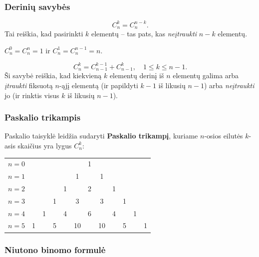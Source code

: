 \subsubsection*{Derinių savybės}

\begin{theorem}
\[
C_n^k = C_n^{n-k}.
\]
Tai reiškia, kad pasirinkti $k$ elementų -- tas pats, kas \emph{neįtraukti} $n - k$ elementų.
\end{theorem}

\begin{corollary}
$C_n^0 = C_n^n = 1$ ir $C_n^1 = C_n^{n-1} = n$.
\end{corollary}

\begin{theorem}
\[
C_n^k = C_{n-1}^{k-1} + C_{n-1}^{k}, \quad 1 \leq k \leq n-1.
\]
Ši savybė reiškia, kad kiekvieną $k$ elementų derinį iš $n$ elementų galima arba \emph{įtraukti} fiksuotą $n$-ąjį elementą (ir papildyti $k-1$ iš likusių $n-1$) arba \emph{neįtraukti} jo (ir rinktis visus $k$ iš likusių $n-1$).
\end{theorem}

\subsubsection*{Paskalio trikampis}

Paskalio taisyklė leidžia sudaryti \textbf{Paskalio trikampį}, kuriame $n$-osios eilutės $k$-asis skaičius yra lygus $C_n^k$:

\begin{center}
\renewcommand{\arraystretch}{1.4}
\begin{tabular}{r|ccccccccccc}
$n=0$ & & & & & & 1 & & & & & \\
$n=1$ & & & & & 1 & & 1 & & & & \\
$n=2$ & & & & 1 & & 2 & & 1 & & & \\
$n=3$ & & & 1 & & 3 & & 3 & & 1 & & \\
$n=4$ & & 1 & & 4 & & 6 & & 4 & & 1 & \\
$n=5$ & 1 & & 5 & & 10 & & 10 & & 5 & & 1 \\
\end{tabular}
\end{center}

\subsubsection*{Niutono binomo formulė}

